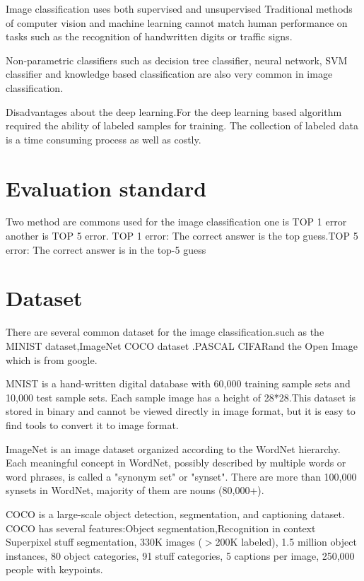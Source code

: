 \documentclass[10pt,twocolumn,letterpaper]{article}
\begin{document}
Image classification uses both supervised and unsupervised
Traditional  methods  of  computer  vision  and  machine
learning cannot match human performance on tasks such
as the recognition of handwritten digits or traffic signs.\cite{ciregancolumn}

Non‐parametric  classifiers  such  as  decision tree   classifier,  neural   network,   SVM   classifier and knowledge based classification are also very common in image classification.

Disadvantages about the deep learning.For the deep learning based algorithm required the ability of labeled samples for training. The collection of labeled data is a time consuming process as well as costly.


\section{Evaluation standard}
Two method are commons used for the image classification one is TOP 1 error another is TOP 5 error.
TOP 1 error: The correct answer is the top guess.TOP 5 error: The correct answer is in the top-5 guess


\section{Dataset}


There are several common dataset for the image classification.such as the MINIST dataset\cite{lecun1998gradientbased},ImageNet\cite{russakovsky2015imagenet} 
COCO dataset \cite{lin2014microsoft}.PASCAL\cite{pascal-voc-2012} CIFAR\cite{Krizhevsky2009Learning}and the Open Image which is from google.

MNIST is a hand-written digital database with 60,000 training sample sets and 10,000 test sample sets. Each sample image has a height of 28*28.This dataset is stored in binary and cannot be viewed directly in image format, but it is easy to find tools to convert it to image format.

 ImageNet is an image dataset organized according to the WordNet hierarchy. Each meaningful concept in WordNet, possibly described by multiple words or word phrases, is called a "synonym set" or "synset". There are more than 100,000 synsets in WordNet, majority of them are nouns (80,000+).


COCO is a large-scale object detection, segmentation, and captioning dataset. COCO has several features:Object segmentation,Recognition in context
Superpixel stuff segmentation,
330K images ($>$200K labeled),
1.5 million object instances,
80 object categories,
91 stuff categories,
5 captions per image,
250,000 people with keypoints.
\end{document}
